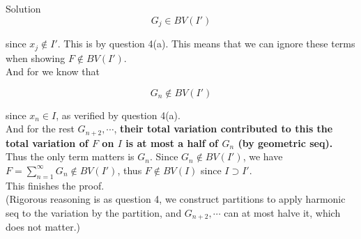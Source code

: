 \begin{qlsolution}{Solution}
\[G_{j} \in BV(I')\]

since \(x_{j} \notin I'\). This is by question 4(a). This means that we can ignore these terms when showing \(F \notin BV(I')\).\\
And for we know that

\[G_{n} \notin BV(I')\]

since \(x_{n} \in I\), as verified by question 4(a).\\
And for the rest \(G_{n + 2},\cdots\), \textbf{their total variation contributed to this the total variation of \(F\) on \(I\) is at most a half of \(G_{n}\) (by geometric seq).}\\
Thus the only term matters is \(G_{n}\). Since \(G_{n} \notin BV(I')\), we have \(F = \sum_{n = 1}^{\infty}G_{n} \notin BV(I')\), thus \(F \notin BV(I)\) since \(I \supset I'\).\\
This finishes the proof.\\
(Rigorous reasoning is as question 4, we construct partitions to apply harmonic seq to the variation by the partition, and \(G_{n + 2},\cdots\) can at most halve it, which does not matter.)

\end{qlsolution}
